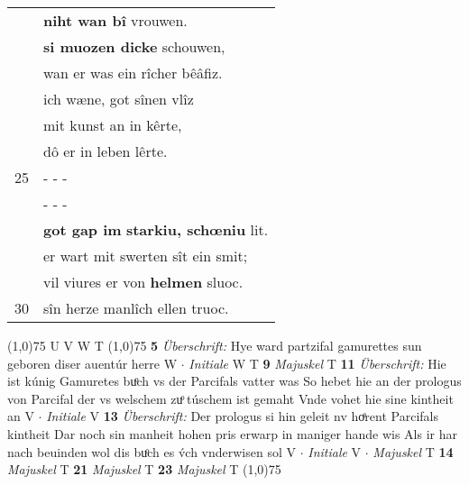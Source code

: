 \documentclass[8pt,a4paper,notitlepage]{article}
\begin{document}
\begin{table}[ht]
\begin{minipage}[t]{0.5\linewidth}
\begin{tabular}{rl}
 & \textbf{niht wan bî} vrouwen.\\ 
 & \textbf{si muozen dicke} schouwen,\\ 
 & wan er was ein rîcher bêâfiz.\\ 
 & ich wæne, got sînen vlîz\\ 
 & mit kunst an in kêrte,\\ 
 & dô er in leben lêrte.\\ 
25 & \multicolumn{1}{l}{ - - - }\\ 
 & \multicolumn{1}{l}{ - - - }\\ 
 & \textbf{got gap im} \textbf{starkiu, schœniu} lit.\\ 
 & er wart mit swerten sît ein smit;\\ 
 & vil viures er von \textbf{helmen} sluoc.\\ 
30 & sîn herze manlîch ellen truoc.\\ 
\end{tabular}
\scriptsize
\line(1,0){75} \newline
U V W T \newline
\line(1,0){75} \newline
\textbf{5} \textit{Überschrift:} Hye ward partzifal gamurettes sun geboren diser auentúr herre W   $\cdot$ \textit{Initiale} W T  \textbf{9} \textit{Majuskel} T  \textbf{11} \textit{Überschrift:} Hie ist kúnig Gamuretes buͦch vs der Parcifals vatter was So hebet hie an der prologus von Parcifal der vs welschem zuͦ túschem ist gemaht Vnde vohet hie sine kintheit an V   $\cdot$ \textit{Initiale} V  \textbf{13} \textit{Überschrift:} Der prologus si hin geleit nv hoͤrent Parcifals kintheit Dar noch sin manheit hohen pris erwarp in maniger hande wis Als ir har nach beuinden wol dis buͦch es v́ch vnderwisen sol V   $\cdot$ \textit{Initiale} V   $\cdot$ \textit{Majuskel} T  \textbf{14} \textit{Majuskel} T  \textbf{21} \textit{Majuskel} T  \textbf{23} \textit{Majuskel} T  \newline
\line(1,0){75} \newline

\end{minipage}
\end{table}
\end{document}
